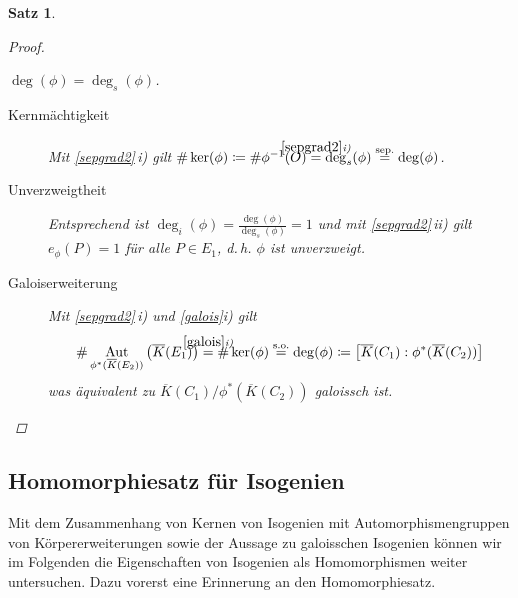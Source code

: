 \documentclass[english, german, parskip=half]{scrartcl}
\newtheorem{Satz}{Satz}[section]
\theoremstyle{definition}
\theoremstyle{remark}
\newcommand*{\algK}{\ensuremath{\overline K}} %
\newcommand*{\degs}{\operatorname{\deg}_s} %
\newcommand*{\degi}{\operatorname{\deg}_i} %
\renewcommand{\O}{O}
\DeclareMathOperator{\Aut}{Aut} %
\begin{document}
\begin{Satz}
\begin{proof}
\begin{enumerate}[label=\roman*)]
      $\deg(\phi)=\degs(\phi)$.
      \begin{description}
        \item[Kernmächtigkeit]
          Mit \autoref{sepgrad2}\,\emph{i)} gilt
          $
          \#\ker(\phi)
          \coloneqq \#\phi^{-1}(\O)
          \overset{\mathclap{\autoref{sepgrad2}\emph{i)}}}{=} \degs(\phi)
          \overset{{\text{sep.}}}{=} \deg(\phi)
          $.
        \item[Unverzweigtheit] 
          Entsprechend ist
          $\degi(\phi)=\frac{\deg(\phi)}{\degs(\phi)}=1$
          und mit \autoref{sepgrad2}\,\emph{ii)} gilt
          $e_\phi(P)=1$ für alle $P\in E_1$, d.\,h. $\phi$
          ist unverzweigt.
        \item[Galoiserweiterung]
          Mit \autoref{sepgrad2}\,\emph{i)} und \autoref{galois}\emph{i)} gilt
          \begin{align*}
            \#\Aut_{\phi^*(\algK(E_2))}\left( \algK(E_1) \right) 
            \overset{\mathclap{\autoref{galois}\emph{i)}}}{=}
              \#\ker(\phi)
            \overset{{\text{s.o.}}}{=} \deg(\phi)
            \coloneqq \left[\algK(C_1):\phi^*(\algK(C_2))\right]
          \end{align*}
          was äquivalent zu
          $\algK(C_1)/\phi^*(\algK(C_2))$ galoissch ist.
        \end{description}
      \end{enumerate}
\end{proof}
\end{Satz}

\subsection{Homomorphiesatz für Isogenien}
Mit dem Zusammenhang von Kernen von Isogenien mit
Automorphismengruppen von Körpererweiterungen sowie der Aussage zu
galoisschen Isogenien können wir im Folgenden die Eigenschaften von
Isogenien als Homomorphismen weiter untersuchen.
Dazu vorerst eine Erinnerung an den Homomorphiesatz.
\end{document}
